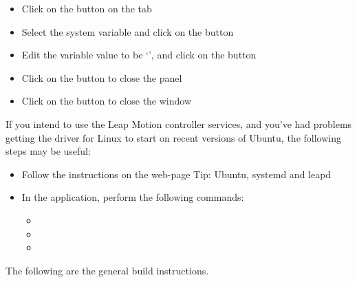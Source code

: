 \begin{itemize}
\item\exSp{}Click on the  button on the 
tab
\item\exSp{}Select the  system variable and click on the
 button 
\item\exSp{}Edit the variable value to be
`', and
click on the  button
\item\exSp{}Click on the  button to close the 
panel
\item\exSp{}Click on the  button to close the 
window
\end{itemize}
\tertiaryEnd
{}
If you intend to use the Leap Motion controller services, and you've had problems getting
the driver for Linux to start on recent versions of Ubuntu, the following steps may be
useful:
\begin{itemize}
\item Follow the instructions on the web-page
%
{Tip: Ubuntu, systemd and leapd}
\item\exSp{}In the  application, perform the following commands:
\begin{itemize}
\item {}
\item\exSp{}
\item\exSp{}
\end{itemize}
\end{itemize}
The following are the general build instructions.
